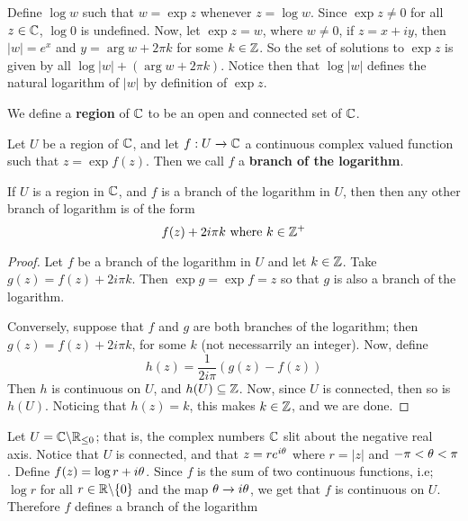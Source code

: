 \begin{example}\label{example_3.6}
    Define $\log{w}$ such that $w=\exp{z}$ whenever $z=\log{w}$. Since $\exp{z}
    \neq 0$ for all $z \in \mathbb{C}$,  $\log{0}$ is undefined. Now, let $\exp{z}=w$,
    where $w \neq 0$, if  $z=x+iy$, then  $|w|=e^x$ and  $y=\arg{w}+2\pi k$ for
    some $k \in \mathbb{Z}$. So the set of solutions to  $\exp{z}$ is given by all
    $\log{|w|}+(\arg{w}+2\pi k)$. Notice then that $\log{|w|}$ defines the
    natural logarithm of $|w|$ by definition of  $\exp{z}$.
\end{example}

\begin{definition}
    We define a \textbf{region} of $\mathbb{C}$ to be an open and connected set of
    $\mathbb{C}$.
\end{definition}

\begin{definition}
    Let $U$ be a region of  $\mathbb{C}$, and let  $f:U \xrightarrow{} \mathbb{C}$ a continuous
    complex valued function such that $z=\exp{f(z)}$. Then we call $f$ a
    \textbf{branch of the logarithm}.
\end{definition}

\begin{lemma}\label{3.2.6}
    If $U$ is a region in  $\mathbb{C}$, and  $f$ is a branch of the logarithm in  $U$,
    then then any other branch of logarithm is of the form
    \begin{equation*}
        f(z)+2i\pi k \text{ where } k \in \mathbb{Z}^+
    \end{equation*}
\end{lemma}
\begin{proof}
    Let $f$ be a branch of the logarithm in  $U$ and let  $k \in \mathbb{Z}$. Take
    $g(z)=f(z)+2i\pi k$. Then $\exp{g}=\exp{f}=z$ so that $g$ is also a branch
    of the logarithm.

    Conversely, suppose that $f$ and $g$ are both branches of the logarithm;
    then $g(z)=f(z)+2i\pi k$, for some $k$ (not necessarrily an integer). Now,
    define
    \begin{equation*}
        h(z)=\frac{1}{2i\pi}(g(z)-f(z))
    \end{equation*}
    Then $h$ is continuous on  $U$, and  $h(U) \subseteq \mathbb{Z}$. Now, since $U$ is
    connected, then so is $h(U)$. Noticing that $h(z)=k$, this makes $k \in \mathbb{Z}$,
    and we are done.
\end{proof}

\begin{definition}
    Let $U=\mathbb{C} \backslash \mathbb{R}_{\leq 0}$; that is, the complex numbers $\mathbb{C}$ slit about
    the negative real axis. Notice that  $U$ is connected, and that
    $z=re^{i\theta}$ where $r=|z|$ and $-\pi < \theta < \pi$. Define
    $f(z)=\log{r}+i\theta$. Since $f$ is the sum of two continuous functions, i.e;
     $\log{r}$ for all $r \in \mathbb{R} \backslash \{0\}$ and the map $\theta \xrightarrow{}
     i\theta$, we get that $f$ is continuous on  $U$. Therefore  $f$ defines a
     branch of the logarithm
\end{definition}

